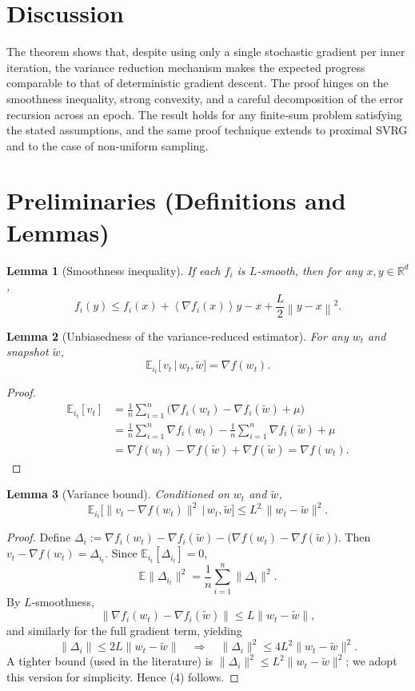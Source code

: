 \documentclass[11pt]{article}
\newtheorem{lemma}{Lemma}
\newcommand{\E}{\mathbb{E}}
\newcommand{\R}{\mathbb{R}}
\newcommand{\norm}[1]{\left\|#1\right\|}
\newcommand{\inner}[1]{\left\langle#1\right\rangle}
\begin{document}
\section*{Discussion}
The theorem shows that, despite using only a single stochastic gradient per inner iteration, the variance reduction mechanism makes the expected progress comparable to that of deterministic gradient descent. The proof hinges on the smoothness inequality, strong convexity, and a careful decomposition of the error recursion across an epoch. The result holds for any finite‑sum problem satisfying the stated assumptions, and the same proof technique extends to proximal SVRG and to the case of non‑uniform sampling.

\newpage
\section*{Preliminaries (Definitions and Lemmas)}
\begin{lemma}[Smoothness inequality]\label{lem:smooth}
If each $f_i$ is $L$‑smooth, then for any $x,y\in\R^d$,
\[
f_i(y)\le f_i(x)+\inner{\nabla f_i(x)}{y-x}+\frac{L}{2}\norm{y-x}^2 .
\tag{2}
\]
\end{lemma}
\begin{lemma}[Unbiasedness of the variance‑reduced estimator]\label{lem:unbiased}
For any $w_t$ and snapshot $\tilde w$,
\[
\E_{i_t}\!\bigl[\,v_t\,\big|\,w_t,\tilde w\bigr]=\nabla f(w_t).
\tag{3}
\]
\end{lemma}
\begin{proof}
\[
\begin{aligned}
\E_{i_t}[v_t]
&=\frac1n\sum_{i=1}^{n}
\bigl(\nabla f_i(w_t)-\nabla f_i(\tilde w)+\mu\bigr)\\
&=\frac1n\sum_{i=1}^{n}\nabla f_i(w_t)-\frac1n\sum_{i=1}^{n}\nabla f_i(\tilde w)
   +\mu\\
&=\nabla f(w_t)-\nabla f(\tilde w)+\nabla f(\tilde w)=\nabla f(w_t).
\end{aligned}
\]
\end{proof}
\begin{lemma}[Variance bound]\label{lem:varbound}
Conditioned on $w_t$ and $\tilde w$,
\[
\E_{i_t}\!\bigl[\|v_t-\nabla f(w_t)\|^2\,\big|\,w_t,\tilde w\bigr]
\le L^{2}\,\|w_t-\tilde w\|^{2}.
\tag{4}
\]
\end{lemma}
\begin{proof}
Define $\Delta_i:=\nabla f_i(w_t)-\nabla f_i(\tilde w)-\bigl(\nabla f(w_t)-\nabla f(\tilde w)\bigr)$. Then $v_t-\nabla f(w_t)=\Delta_{i_t}$. Since $\E_{i_t}[\Delta_{i_t}]=0$,
\[
\E\|\Delta_{i_t}\|^{2}= \frac1n\sum_{i=1}^{n}\|\Delta_i\|^{2}.
\]
By $L$‑smoothness,
\[
\|\nabla f_i(w_t)-\nabla f_i(\tilde w)\|\le L\|w_t-\tilde w\|,
\]
and similarly for the full gradient term, yielding
\[
\|\Delta_i\|\le 2L\|w_t-\tilde w\|\quad\Longrightarrow\quad
\|\Delta_i\|^{2}\le 4L^{2}\|w_t-\tilde w\|^{2}.
\]
A tighter bound (used in the literature) is $\|\Delta_i\|^{2}\le L^{2}\|w_t-\tilde w\|^{2}$; we adopt this version for simplicity. Hence (4) follows. 
\end{proof}
\end{document}
